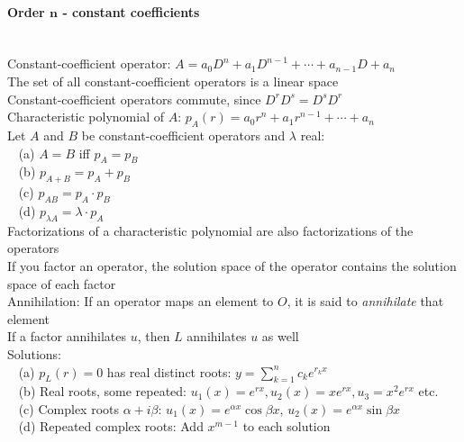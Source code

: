 \documentclass[10pt]{article}
\begin{document}
\paragraph{Order $\boldsymbol{n}$ - constant coefficients}\ \\
Constant-coefficient operator: $A = a_0D^n + a_1D^{n-1} + \dotsb + a_{n-1}D + a_n$\\
The set of all constant-coefficient operators is a linear space\\
Constant-coefficient operators commute, since $D^rD^s = D^sD^r$\\
Characteristic polynomial of $A$: $p_A(r) = a_0r^n + a_1r^{n-1} + \dotsb + a_n$\\
Let $A$ and $B$ be constant-coefficient operators and $\lambda$ real:\\
$\phantom{x}$ (a) $A = B$ iff $p_A = p_B$\\
$\phantom{x}$ (b) $p_{A+B} = p_A + p_B$\\
$\phantom{x}$ (c) $p_{AB} = p_A \cdot p_B$\\
$\phantom{x}$ (d) $p_{\lambda A} = \lambda \cdot p_A$\\
Factorizations of a characteristic polynomial are also factorizations of the operators\\
If you factor an operator, the solution space of the operator contains the solution space of each factor\\
Annihilation: If an operator maps an element to $O$, it is said to {\it annihilate} that element\\
If a factor annihilates $u$, then $L$ annihilates $u$ as well\\
Solutions:\\
$\phantom{x}$ (a) $p_L(r) = 0$ has real distinct roots: $y = \sum_{k=1}^n c_k e^{r_k x}$\\
$\phantom{x}$ (b) Real roots, some repeated: $u_1(x) = e^{rx}, u_2(x) = xe^{rx}, u_3 = x^2e^{rx}$ etc.\\
$\phantom{x}$ (c) Complex roots $\alpha + i \beta$: $u_1(x) = e^{\alpha x}\cos \beta x$, $u_2(x) = e^{\alpha x}\sin \beta x$\\
$\phantom{x}$ (d) Repeated complex roots: Add $x^{m-1}$ to each solution
\end{document}
